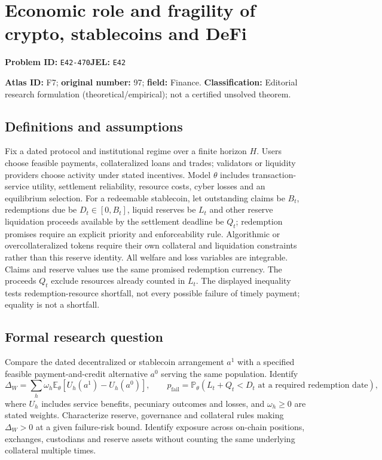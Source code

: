 \documentclass[11pt,a4paper]{article}
\begin{document}
\section*{Economic role and fragility of crypto, stablecoins and DeFi}
\textbf{Problem ID:} \texttt{E42-470}\quad \textbf{JEL:} \texttt{E42}\par
\label{problem:OP-0097}
\label{atlas:prob:F7}

\noindent\textbf{Atlas ID:} F7; \textbf{original number:} 97; \textbf{field:} Finance. \textbf{Classification:} Editorial research formulation (theoretical/empirical); not a certified unsolved theorem.

\subsection*{Definitions and assumptions}
Fix a dated protocol and institutional regime over a finite horizon $H$. Users choose feasible payments, collateralized loans and trades; validators or liquidity providers choose activity under stated incentives. Model $\theta$ includes transaction-service utility, settlement reliability, resource costs, cyber losses and an equilibrium selection. For a redeemable stablecoin, let outstanding claims be $B_t$, redemptions due be $D_t\in[0,B_t]$, liquid reserves be $L_t$ and other reserve liquidation proceeds available by the settlement deadline be $Q_t$; redemption promises require an explicit priority and enforceability rule. Algorithmic or overcollateralized tokens require their own collateral and liquidation constraints rather than this reserve identity. All welfare and loss variables are integrable. Claims and reserve values use the same promised redemption currency. The proceeds $Q_t$ exclude resources already counted in $L_t$. The displayed inequality tests redemption-resource shortfall, not every possible failure of timely payment; equality is not a shortfall.

\subsection*{Formal research question}
Compare the dated decentralized or stablecoin arrangement $a^1$ with a specified feasible payment-and-credit alternative $a^0$ serving the same population. Identify
\[
 \Delta_W=\sum_h\omega_h\mathbb E_\theta[U_h(a^1)-U_h(a^0)],
 \qquad
 p_{\mathrm{fail}}=\mathbb P_\theta(L_t+Q_t<D_t
   \text{ at a required redemption date}),
\]
where $U_h$ includes service benefits, pecuniary outcomes and losses, and $\omega_h\ge0$ are stated weights. Characterize reserve, governance and collateral rules making $\Delta_W>0$ at a given failure-risk bound. Identify exposure across on-chain positions, exchanges, custodians and reserve assets without counting the same underlying collateral multiple times.
\end{document}
